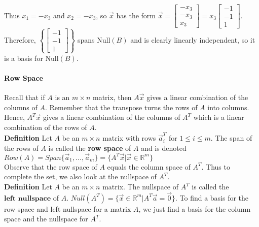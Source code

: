 \documentclass[10pt,letter]{article}
\begin{document}
Thus $x_1=-x_3$ and $x_2=-x_3$, so $\vec{x}$ has the form $\vec{x}=\begin{bmatrix}-x_3\\-x_3\\x_3\end{bmatrix}=x_3\begin{bmatrix}-1\\-1\\1\end{bmatrix}$. Therefore, $\left\{\begin{bmatrix}-1\\-1\\1\end{bmatrix}\right\}$ spans Null$(B)$ and is clearly linearly independent, so it is a basis for Null$(B)$. 

\paragraph{Row Space} Recall that if $A$ is an $m\times n$ matrix, then $A\vec{x}$ gives a linear combination of the columns of $A$. Remember that the transpose turns the rows of $A$ into columns. Hence, $A^T\vec{x}$ gives a linear combination of the columns of $A^T$ which is a linear combination of the rows of $A$. \\ 
\textbf{Definition} Let $A$ be an $m\times n$ matrix with rows $\vec{a}_i^T$ for $1\leq i\leq m$. The span of the rows of $A$ is called the \textbf{row space} of $A$ and is denoted $Row(A)=Span\{\vec{a}_1,\ldots,\vec{a}_m\}=\{A^T\vec{x}|\vec{x}\in\mathbb{R}^m\}$ \\ 
Observe that the row space of $A$ equals the column space of $A^T$. Thus to complete the set, we also look at the nullspace of $A^T$. \\ 
\textbf{Definition} Let $A$ be an $m\times n$ matrix. The nullspace of $A^T$ is called the $\textbf{left nullspace}$ of $A$. $Null(A^T)=\{\vec{x}\in\mathbb{R}^m|A^T\vec{a}=\vec{0}\}$. To find a basis for the row space and left nullspace for a matrix $A$, we just find a basis for the column space and the nullspace for $A^T$. 
\end{document}

